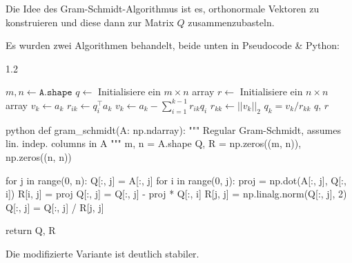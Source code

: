\newpage
{}

Die Idee des Gram-Schmidt-Algorithmus ist es, orthonormale Vektoren zu konstruieren und diese dann zur Matrix $Q$ zusammenzubasteln.

Es wurden zwei Algorithmen behandelt, beide unten in Pseudocode \& Python:
\begin{algorithm}
    \begin{spacing}{1.2}
        \caption{\textsc{classicalGramSchmidt}(A)}
        \begin{algorithmic}[1]
            \State $m, n \gets \texttt{A.shape}$
            \State $q \gets$ Initialisiere ein $m \times n$ array
            \State $r \gets$ Initialisiere ein $n \times n$ array
                \State $v_k \gets a_k$ 
                    \State $r_{ik} \gets q_i^\top a_k$
                    \State $v_k \gets a_k - \sum_{i = 1}^{k - 1} r_{ik} q_i$
                \EndFor
                \State $r_{kk} \gets ||v_k||_2$
                \State $q_k = v_k / r_{kk}$ 
            \EndFor
            \State \Return $q$, $r$
        \end{algorithmic}
    \end{spacing}
\end{algorithm}

\begin{code}{python}
def gram_schmidt(A: np.ndarray):
    """ Regular Gram-Schmidt, assumes lin. indep. columns in A """
    m, n = A.shape
    Q, R = np.zeros((m, n)), np.zeros((n, n))
    
    for j in range(0, n):
        Q[:, j] = A[:, j]
        for i in range(0, j):
            proj = np.dot(A[:, j], Q[:, i])
            R[i, j] = proj
            Q[:, j] = Q[:, j] - proj * Q[:, i]
        R[j, j] = np.linalg.norm(Q[:, j], 2)
        Q[:, j] = Q[:, j] / R[j, j]
    
    return Q, R
\end{code}

\newpage

Die modifizierte Variante ist deutlich stabiler.\\

